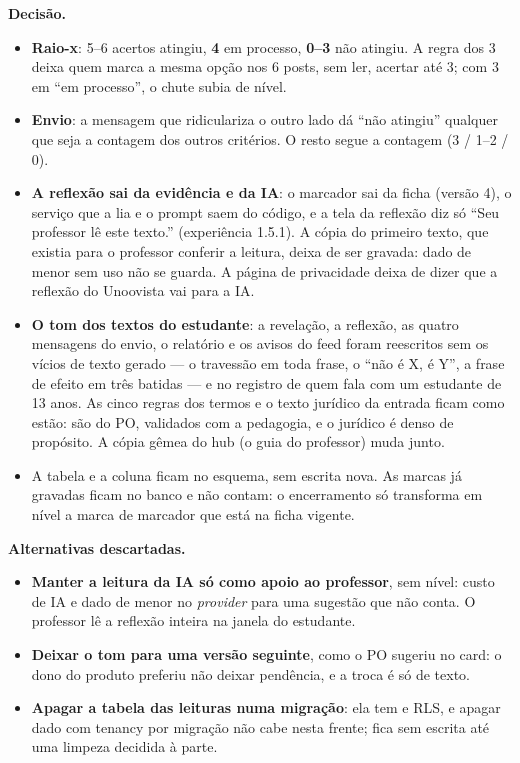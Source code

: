 \textbf{Decisão.}

\begin{itemize}
  \item \textbf{Raio-x}: 5--6 acertos atingiu, \textbf{4} em processo,
    \textbf{0--3} não atingiu. A regra dos 3 deixa quem marca a mesma opção
    nos 6 posts, sem ler, acertar até 3; com 3 em \enquote{em processo}, o
    chute subia de nível.
  \item \textbf{Envio}: a mensagem que ridiculariza o outro lado dá
    \enquote{não atingiu} qualquer que seja a contagem dos outros critérios.
    O resto segue a contagem (3 / 1--2 / 0).
  \item \textbf{A reflexão sai da evidência e da IA}: o marcador
     sai da ficha (versão 4), o serviço que a lia e o prompt
    saem do código, e a tela da reflexão diz só \enquote{Seu professor lê
    este texto.} (experiência 1.5.1). A cópia do primeiro texto, que existia
    para o professor conferir a leitura, deixa de ser gravada: dado de menor
    sem uso não se guarda. A página de privacidade deixa de dizer que a
    reflexão do Unoovista vai para a IA.
  \item \textbf{O tom dos textos do estudante}: a revelação, a reflexão, as
    quatro mensagens do envio, o relatório e os avisos do feed foram
    reescritos sem os vícios de texto gerado --- o travessão em toda frase, o
    \enquote{não é X, é Y}, a frase de efeito em três batidas --- e no
    registro de quem fala com um estudante de 13 anos. As cinco regras dos
    termos e o texto jurídico da entrada ficam como estão: são do PO,
    validados com a pedagogia, e o jurídico é denso de propósito. A cópia
    gêmea do hub (o guia do professor) muda junto.
  \item A tabela  e a coluna
     ficam no esquema, sem escrita nova. As marcas
     já gravadas ficam no banco e não contam: o encerramento só
    transforma em nível a marca de marcador que está na ficha vigente.
\end{itemize}

\textbf{Alternativas descartadas.}

\begin{itemize}
  \item \textbf{Manter a leitura da IA só como apoio ao professor}, sem nível:
    custo de IA e dado de menor no \emph{provider} para uma sugestão que não
    conta. O professor lê a reflexão inteira na janela do estudante.
  \item \textbf{Deixar o tom para uma versão seguinte}, como o PO sugeriu no
    card: o dono do produto preferiu não deixar pendência, e a troca é só de
    texto.
  \item \textbf{Apagar a tabela das leituras numa migração}: ela tem
     e RLS, e apagar dado com tenancy por migração não cabe
    nesta frente; fica sem escrita até uma limpeza decidida à parte.
\end{itemize}

